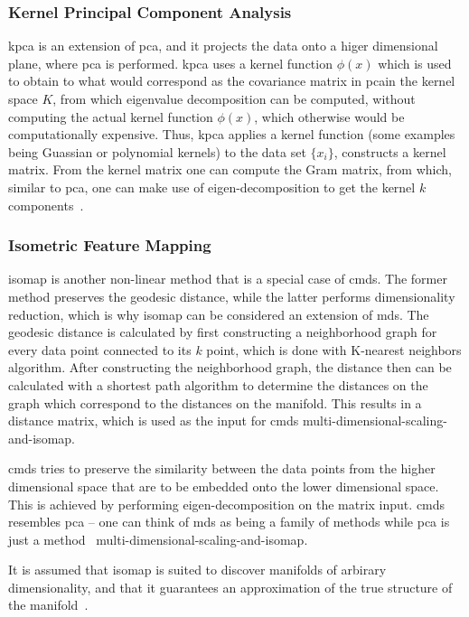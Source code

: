 \subsubsection{Kernel Principal Component Analysis}\label{subsubsec:kernel-principal-component-analysis}
\gls{kpca} is an extension of \gls{pca}, and it projects the data onto a higer dimensional plane, where \gls{pca} is performed. \gls{kpca} uses a kernel function $\phi (x)$ which is used to obtain to what would correspond as the covariance matrix in \gls{pca}in the kernel space $K$, from which eigenvalue decomposition can be computed, without computing the actual kernel function $\phi (x)$, which otherwise would be computationally expensive. Thus, \gls{kpca} applies a kernel function (some examples being Guassian or polynomial kernels) to the data set $ \{x_{i} \}$, constructs a kernel matrix. From the kernel matrix one can compute the Gram matrix, from which, similar to \gls{pca}, one can make use of eigen-decomposition to get the kernel $k$ components~\cite{kernel-pca}.


\subsubsection{Isometric Feature Mapping}\label{subsubsec:isometric-feature-mapping}
\gls{isomap} is another non-linear method that is a special case of \gls{cmds}. The former method preserves the geodesic distance, while the latter performs dimensionality reduction, which is why \gls{isomap} can be considered an extension of \gls{mds}. The geodesic distance is calculated by first constructing a neighborhood graph for every data point connected to its $k$ point, which is done with K-nearest neighbors algorithm. After constructing the neighborhood graph, the distance then can be calculated with a shortest path algorithm to determine the distances on the graph which correspond to the distances on the manifold. This results in a distance matrix, which is used as the input for \gls{cmds} multi-dimensional-scaling-and-isomap.

\gls{cmds} tries to preserve the similarity between the data points from the higher dimensional space that are to be embedded onto the lower dimensional space. This is achieved by performing eigen-decomposition on the matrix input. \gls{cmds} resembles \gls{pca} -- one can think of \gls{mds} as being a family of methods while \gls{pca} is just a method~\cite{difference-between-pca-and-mds} multi-dimensional-scaling-and-isomap.

It is assumed that \gls{isomap} is suited to discover manifolds of arbirary dimensionality, and that it guarantees an approximation of the true structure of the manifold~\cite{tennenbaum}.


